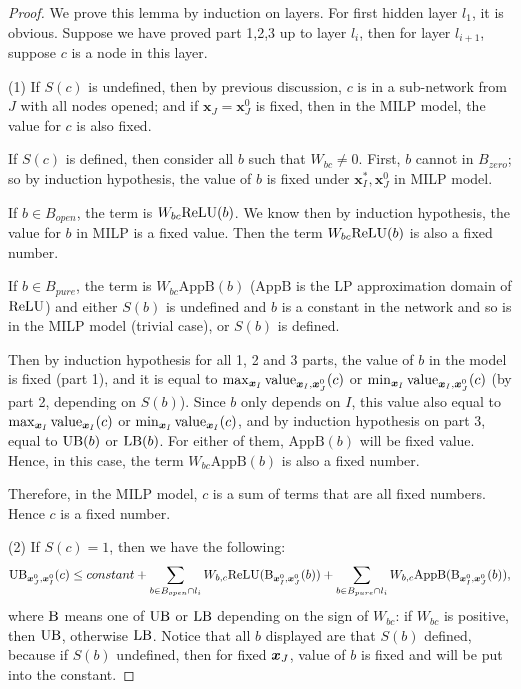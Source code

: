 			\begin{proof}
				We prove this lemma by induction on layers. For first hidden layer $l_1$, it is obvious. Suppose we have proved part 1,2,3 up to layer $l_i$, then for layer $l_{i+1}$, suppose $c$ is a node in this layer. 
				
				(1)	If $S(c)$ is undefined, then by previous discussion, $c$ is in a sub-network from $J$ with all nodes opened; and if $\boldsymbol{x}_J=\boldsymbol{x}_J^0$ is fixed, then in the MILP model, the value for $c$ is also fixed. 
				
				If $S(c)$ is defined, then consider all $b$ such that $W_{bc}\neq 0$. First, $b$ cannot in $B_{zero}$; so by induction hypothesis, the value of $b$ is fixed under $\boldsymbol{x}^*_I,\boldsymbol{x}^0_J$ in MILP model. 
				
				
				
				If $b\in B_{open}$, the term is $W_{bc}\mathrm{ReLU}(b)$. We know then by induction hypothesis, the value for $b$ in MILP is a fixed value. Then the term $W_{bc}\mathrm{ReLU}(b)$ is also a fixed number.  
				
				If $b\in B_{pure}$, the term is $W_{bc}\mathrm{AppB}(b)$ ($\mathrm{AppB}$ is the LP approximation domain of $\mathrm{ReLU}$) and either $S(b)$ is undefined and $b$ is a constant in the network and so is in the MILP model (trivial case), or $S(b)$ is defined. 
				
				Then by induction hypothesis for all 1, 2 and 3 parts,  the value of $b$ in the model is fixed (part 1), and it is equal to $\max_{\boldsymbol{x}_I} {\textrm{value}}_{\boldsymbol{x}_I,\boldsymbol{x}^0_J}(c)$ or $\min_{\boldsymbol{x}_I} {\textrm{value}}_{\boldsymbol{x}_I,\boldsymbol{x}^0_J}(c)$ (by part 2, depending on $S(b)$). Since $b$ only depends on $I$, this value also equal to $\max_{\boldsymbol{x}_I} {\textrm{value}}_{\boldsymbol{x}_I}(c)$ or $\min_{\boldsymbol{x}_I} {\textrm{value}}_{\boldsymbol{x}_I}(c)$, and by induction hypothesis on part 3, equal to $\mathrm{UB}(b)$ or $\mathrm{LB}(b)$. For either of them, $\mathrm{AppB}(b)$ will be fixed value. Hence, in this case, the term $W_{bc}\mathrm{AppB}(b)$ is also a fixed number.
				
				Therefore, in the MILP model, $c$ is a sum of terms that are all fixed numbers. Hence $c$ is a fixed number.
				
				(2) If $S(c)=1$, then we have the following:	\begin{align*}
					\mathrm{UB}_{\boldsymbol{x}^0_J,\boldsymbol{x}^0_I}(c) \leq constant + \sum_{b\in B_{open}\cap l_i} W_{b,c}\mathrm{ReLU}(\mathrm{B}_{\boldsymbol{x}^0_I,\boldsymbol{x}^0_J}(b)) + \sum_{b\in B_{pure}\cap l_{i}} W_{b,c} \mathrm{AppB}(\mathrm{B}_{\boldsymbol{x}^0_I,\boldsymbol{x}^0_J}(b)),
				\end{align*}where $\mathrm{B}$ means one of $\mathrm{UB}$ or $\mathrm{LB}$ depending on the sign of $W_{bc}$: if $W_{bc}$ is positive, then $\mathrm{UB}$, otherwise $\mathrm{LB}$. Notice that all $b$ displayed are that $S(b)$ defined, because if $S(b)$ undefined, then for fixed $\boldsymbol{x}_J$, value of $b$ is fixed and will be put into the constant.
				

\end{proof}
